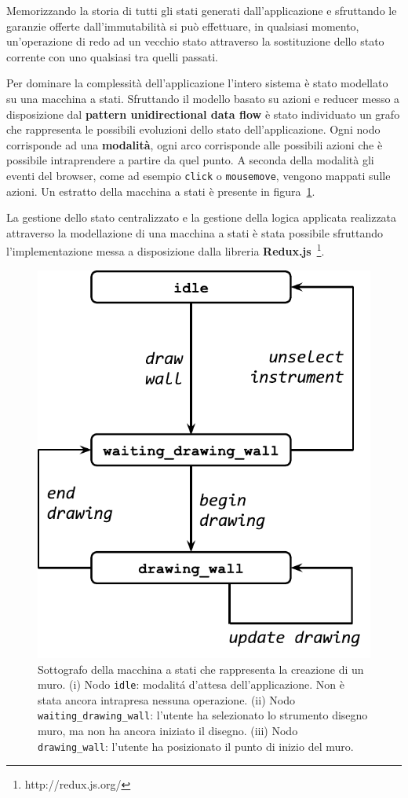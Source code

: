 Memorizzando la storia di tutti gli stati generati dall'applicazione e sfruttando le garanzie offerte dall'immutabilità si può effettuare, in qualsiasi momento, un'operazione di redo ad un vecchio stato attraverso la sostituzione dello stato corrente con uno qualsiasi tra quelli passati.

Per dominare la complessit\`a dell'applicazione l'intero sistema \`e stato modellato su una macchina a stati. Sfruttando il modello basato su azioni e reducer messo a disposizione dal \textbf{pattern unidirectional data flow} \`e stato individuato un grafo che rappresenta le possibili evoluzioni dello stato dell'applicazione. Ogni nodo corrisponde ad una \textbf{modalit\`a}, ogni arco corrisponde alle possibili azioni che è possibile intraprendere a partire da quel punto. A seconda della modalit\`a gli eventi del browser, come ad esempio \texttt{click} o \texttt{mousemove}, vengono mappati sulle azioni. Un estratto della macchina a stati \`e presente in figura~\ref{fig_uc_draw_wall}.

La gestione dello stato centralizzato e la gestione della logica applicata realizzata  attraverso la modellazione di una macchina a stati è stata possibile sfruttando l'implementazione messa a disposizione dalla libreria \textbf{Redux.js}~\footnote{http://redux.js.org/}.


\begin{figure}[!t]
\centering
\includegraphics[width=0.6\linewidth]{contents/images/uc_draw_wall}

\caption{Sottografo della macchina a stati che rappresenta la creazione di un muro. (i) Nodo \texttt{idle}: modalit\'a d'attesa dell'applicazione. Non è stata ancora intrapresa nessuna operazione. (ii) Nodo \texttt{waiting\_drawing\_wall}: l'utente ha selezionato lo strumento disegno muro, ma non ha ancora iniziato il disegno. (iii) Nodo \texttt{drawing\_wall}: l'utente ha posizionato il punto di inizio del muro.}
\label{fig_uc_draw_wall}
\end{figure}
\fi


